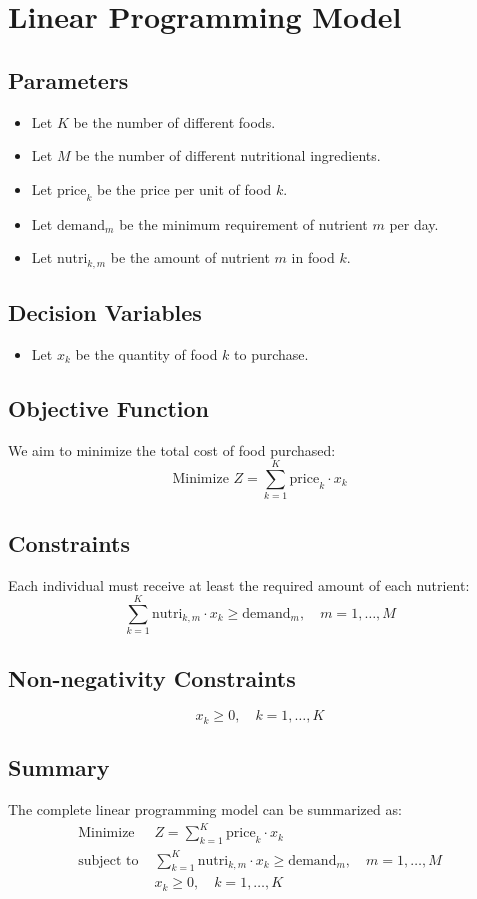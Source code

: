 \documentclass{article}
\begin{document}
\section*{Linear Programming Model}

\subsection*{Parameters}
\begin{itemize}
    \item Let \( K \) be the number of different foods.
    \item Let \( M \) be the number of different nutritional ingredients.
    \item Let \( \text{price}_{k} \) be the price per unit of food \( k \).
    \item Let \( \text{demand}_{m} \) be the minimum requirement of nutrient \( m \) per day.
    \item Let \( \text{nutri}_{k, m} \) be the amount of nutrient \( m \) in food \( k \).
\end{itemize}

\subsection*{Decision Variables}
\begin{itemize}
    \item Let \( x_{k} \) be the quantity of food \( k \) to purchase.
\end{itemize}

\subsection*{Objective Function}
We aim to minimize the total cost of food purchased:
\[
\text{Minimize } Z = \sum_{k=1}^{K} \text{price}_{k} \cdot x_{k}
\]

\subsection*{Constraints}
Each individual must receive at least the required amount of each nutrient:
\[
\sum_{k=1}^{K} \text{nutri}_{k, m} \cdot x_{k} \geq \text{demand}_{m}, \quad m = 1, \ldots, M
\]

\subsection*{Non-negativity Constraints}
\[
x_{k} \geq 0, \quad k = 1, \ldots, K
\]

\subsection*{Summary}
The complete linear programming model can be summarized as:
\[
\begin{align*}
\text{Minimize } & Z = \sum_{k=1}^{K} \text{price}_{k} \cdot x_{k} \\
\text{subject to } & \sum_{k=1}^{K} \text{nutri}_{k, m} \cdot x_{k} \geq \text{demand}_{m}, \quad m = 1, \ldots, M \\
& x_{k} \geq 0, \quad k = 1, \ldots, K
\end{align*}
\]
\end{document}
